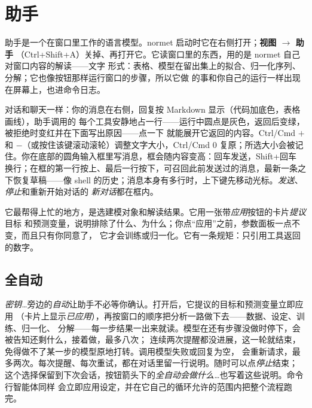 \documentclass[11pt]{ctexrep}
\newcommand{\nm}{\textsf{normet}}
\newcommand{\tab}[1]{\textbf{#1}}
\begin{document}
\chapter{助手}\label{ch:assistant}

助手是一个在窗口里工作的语言模型。\nm{} 启动时它在右侧打开；\tab{视图 $\rightarrow$ 助手}
（Ctrl+Shift+A）关掉、再打开它。它读窗口里的东西，用的是 \nm{} 自己对窗口内容的解读——文字
形式：表格、模型在留出集上的拟合、归一化序列、分解；它也像按钮那样运行窗口的步骤，所以它做
的事和你自己的运行一样出现在屏幕上，也进命令日志。

对话和聊天一样：你的消息在右侧，回复按 Markdown 显示（代码加底色，表格画线），助手调用的
每个工具安静地占一行——运行中圆点是灰色，返回后变绿，被拒绝时变红并在下面写出原因——点一下
就能展开它返回的内容。Ctrl/Cmd $+$ 和 $-$（或按住该键滚动滚轮）调整文字大小，Ctrl/Cmd 0
复原；所选大小会被记住。你在底部的圆角输入框里写消息，框会随内容变高：回车发送，Shift+回车
换行；在框的第一行按上、最后一行按下，可召回此前发送过的消息，最新一条之下恢复草稿——像
shell 的历史；消息本身有多行时，上下键先移动光标。\emph{发送}、\emph{停止}和重新开始对话的
\emph{新对话}都在框内。

它最帮得上忙的地方，是选建模对象和解读结果。它用一张带\emph{应用}按钮的卡片\emph{提议}目标
和预测变量，说明排除了什么、为什么；你点“应用”之前，参数面板一点不变，而且只有你同意了，
它才会训练或归一化。它有一条规矩：只引用工具返回的数字。

\section{全自动}\label{sec:autoassistant}
\emph{密钥…}旁边的\emph{自动}让助手不必等你确认。打开后，它提议的目标和预测变量立即应用
（卡片上显示\emph{已应用}），再按窗口的顺序把分析一路做下去——数据、设定、训练、归一化、
分解——每一步结果一出来就读。模型在还有步骤没做时停下，会被告知还剩什么，接着做，最多八次；
连续两次提醒都没进展，这一轮就结束，免得做不了某一步的模型原地打转。调用模型失败或回复为空，
会重新请求，最多两次。每次提醒、每次重试，都在对话里留一行说明。随时可以点\emph{停止}结束；
这个选择保留到下次会话，按钮箭头下的\emph{全自动会做什么…}也写着这些说明。命令行智能体同样
会立即应用设定，并在它自己的循环允许的范围内把整个流程跑完。
\end{document}
